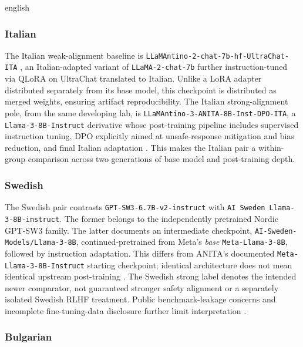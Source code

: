 \begin{otherlanguage*}{english}
\subsubsection{Italian}

The Italian weak-alignment baseline is \texttt{LLaMAntino-2-chat-7b-hf-UltraChat-ITA} \cite{basileLLaMAntino2023}, an Italian-adapted variant of \texttt{LLaMA-2-chat-7b} further instruction-tuned via QLoRA on UltraChat translated to Italian. Unlike a LoRA adapter distributed separately from its base model, this checkpoint is distributed as merged weights, ensuring artifact reproducibility. The Italian strong-alignment pole, from the same developing lab, is \texttt{LLaMAntino-3-ANITA-8B-Inst-DPO-ITA}, a \texttt{Llama-3-8B-Instruct} derivative whose post-training pipeline includes supervised instruction tuning, DPO explicitly aimed at unsafe-response mitigation and bias reduction, and final Italian adaptation \cite{polignanoLLaMAntino3ANITA2025, swapUnibaLLaMAntino3ANITA8BInstDPOITA2026}. This makes the Italian pair a within-group comparison across two generations of base model and post-training depth.

\subsubsection{Swedish}

The Swedish pair contrasts \texttt{GPT-SW3-6.7B-v2-instruct} with \texttt{AI Sweden Llama-3-8B-instruct}. The former belongs to the independently pretrained Nordic GPT-SW3 family. The latter documents an intermediate checkpoint, \texttt{AI-Sweden-Models/Llama-3-8B}, continued-pretrained from Meta's \emph{base} \texttt{Meta-Llama-3-8B}, followed by instruction adaptation. This differs from ANITA's documented \texttt{Meta-Llama-3-8B-Instruct} starting checkpoint; identical architecture does not mean identical upstream post-training \cite{ekgren-etal-2024-gpt,AISwedenModelsLlama38B2024,aisweden_llama3_2024,swapUnibaLLaMAntino3ANITA8BInstDPOITA2026}. The Swedish strong label denotes the intended newer comparator, not guaranteed stronger safety alignment or a separately isolated Swedish RLHF treatment. Public benchmark-leakage concerns and incomplete fine-tuning-data disclosure further limit interpretation \cite{AISwedenModelsLlama38BInstructDiscussion62025}.

\subsubsection{Bulgarian}


\end{otherlanguage*}
